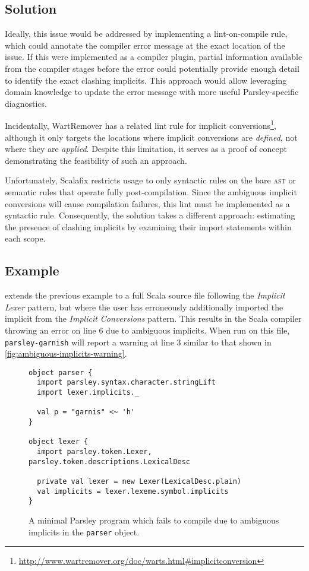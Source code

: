 \documentclass[../../main.tex]{subfiles}
\begin{document}
\subsection*{Solution}
Ideally, this issue would be addressed by implementing a lint-on-compile rule, which could annotate the compiler error message at the exact location of the issue.
If this were implemented as a compiler plugin, partial information available from the compiler stages before the error could potentially provide enough detail to identify the exact clashing implicits.
This approach would allow leveraging domain knowledge to update the error message with more useful Parsley-specific diagnostics.

Incidentally, WartRemover has a related lint rule for implicit conversions\footnote{\url{http://www.wartremover.org/doc/warts.html#implicitconversion}},
although it only targets the locations where implicit conversions are \emph{defined}, not where they are \emph{applied}.
Despite this limitation, it serves as a proof of concept demonstrating the feasibility of such an approach.

Unfortunately, Scalafix restricts usage to only syntactic rules on the bare \textsc{ast} or semantic rules that operate fully post-compilation.
Since the ambiguous implicit conversions will cause compilation failures, this lint must be implemented as a syntactic rule.
Consequently, the solution takes a different approach: estimating the presence of clashing implicits by examining their import statements within each scope.

\subsection*{Example}
 extends the previous example to a full Scala source file following the \emph{Implicit Lexer} pattern,
but where the user has erroneously additionally imported the  implicit from the \emph{Implicit Conversions} pattern.
This results in the Scala compiler throwing an error on line 6 due to ambiguous implicits.
When run on this file, \texttt{parsley-garnish} will report a warning at line 3 similar to that shown in \cref{fig:ambiguous-implicits-warning}.

\begin{figure}[htbp]
\begin{verbatim}
object parser {
  import parsley.syntax.character.stringLift
  import lexer.implicits._

  val p = "garnis" <~ 'h'
}

object lexer {
  import parsley.token.Lexer, parsley.token.descriptions.LexicalDesc

  private val lexer = new Lexer(LexicalDesc.plain)
  val implicits = lexer.lexeme.symbol.implicits
}
\end{verbatim}
\caption{A minimal Parsley program which fails to compile due to ambiguous implicits in the \texttt{parser} object.}
\label{fig:ambiguous-implicits-example}
\end{figure}
\end{document}
